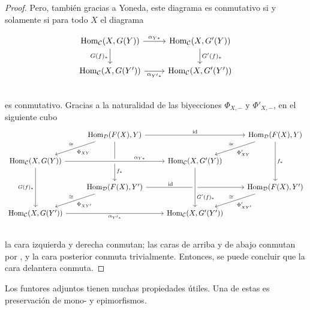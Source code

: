 \documentclass{article}
\numberwithin{equation}{section}
\theoremstyle{definition}
\begin{document}
\begin{proposicion}
\begin{proof}
    Pero, también gracias a Yoneda, este diagrama es conmutativo si y solamente si
    para todo $X$ el diagrama

    \[ \begin{tikzcd}
        \Hom_\vcateg{C} (X,G (Y)) \ar{r}{\alpha_{Y*}}\ar{d}[swap]{G (f)_*} & \Hom_\vcateg{C} (X,G' (Y))\ar{d}{G' (f)_*} \\
        \Hom_\vcateg{C} (X,G (Y')) \ar{r}[swap]{\alpha_{Y' *}} & \Hom_\vcateg{C} (X,G' (Y')) \\
      \end{tikzcd} \]
    es conmutativo. Gracias a la naturalidad de las biyecciones $\Phi_{X,-}$ y
    $\Phi'_{X,-}$, en el siguiente cubo
    \[ \begin{tikzcd}
        & \Hom_\vcateg{D} (F(X), Y) \ar{rr}{\idid}\ar[]{dd}[near end]{f_*}\ar{dl}{\Phi_{XY}}[swap]{\isom} && \Hom_\vcateg{D} (F (X), Y)\ar{dd}{f_*}\ar{dl}{\Phi'_{XY}}[swap]{\isom} \\
        \Hom_\vcateg{C} (X,G (Y)) \ar[crossing over]{rr}[near end]{\alpha_{Y*}}\ar{dd}[swap]{G (f)_*} && \Hom_\vcateg{C} (X,G' (Y)) \\
        & \Hom_\vcateg{D} (F (X), Y') \ar{rr}[near start]{\idid}\ar{dl}{\Phi_{XY'}}[swap]{\isom} && \Hom_\vcateg{D} (F (X), Y')\ar{dl}{\Phi'_{XY'}}[swap]{\isom} \\
        \Hom_\vcateg{C} (X,G (Y')) \ar{rr}[swap]{\alpha_{Y' *}} && \Hom_\vcateg{C} (X,G' (Y'))\ar[leftarrow, crossing over]{uu}[near start,swap]{G' (f)_*} \\
      \end{tikzcd} \]
    la cara izquierda y derecha conmutan; las caras de arriba y de abajo
    conmutan por , y la cara posterior
    conmuta trivialmente. Entonces, se puede concluir que la cara delantera
    conmuta.
  \end{proof}
\end{proposicion}

Los funtores adjuntos tienen muchas propiedades útiles. Una de estas es
preservación de mono- y epimorfismos.
\end{document}
